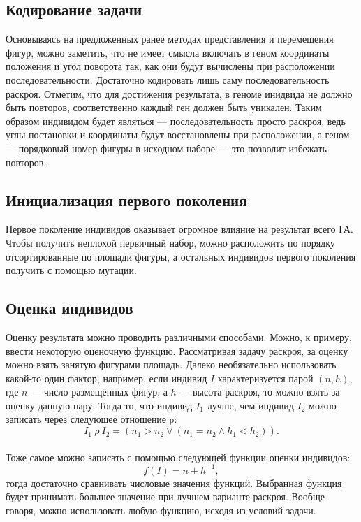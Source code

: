 \documentclass[14pt]{extarticle}
\begin{document}
	\subsection{Кодирование задачи}
	Основываясь на предложенных ранее методах представления и перемещения фигур, можно заметить, что не имеет смысла включать в геном координаты положения и угол поворота так, как они будут вычислены при расположении последовательности. Достаточно кодировать лишь саму последовательность раскроя. Отметим, что для достижения результата, в геноме инидвида не должно быть повторов, соответственно каждый ген должен быть уникален. Таким образом индивидом будет являться --- последовательность просто раскроя, ведь углы постановки и координаты будут восстановлены при расположении, а геном --- порядковый номер фигуры в исходном наборе --- это позволит избежать повторов.
	\subsection{Инициализация первого поколения}
	Первое поколение индивидов оказывает огромное влияние на результат всего ГА. Чтобы получить неплохой первичный набор, можно расположить по порядку отсортированные по площади фигуры, а остальных индивидов первого поколения получить с помощью мутации.
	\subsection{Оценка индивидов}
	Оценку результата можно проводить различными способами. Можно, к примеру, ввести некоторую оценочную функцию. Рассматривая задачу раскроя, за оценку можно взять занятую фигурами площадь. Далеко необязательно использовать какой-то один фактор, например, если индивид $I$ характеризуется парой $(n, h)$, где $n$ --- число размещённых фигур, а $h$ --- высота раскроя, то можно взять за оценку данную пару. Тогда то, что индивид $I_1$ лучше, чем индивид $I_2$ можно записать через следующее отношение $\mathrm{\rho}$:
	\begin{equation}
		I_1~\rho~I_2=(n_1>n_2\lor(n_1=n_2\land h_1<h_2)).
	\end{equation}
	\paragraph{}
	Тоже самое можно записать с помощью следующей функции оценки индивидов:
	\begin{equation}
		f(I)=n+h^{-1},
	\end{equation}
	тогда достаточно сравнивать числовые значения функций. Выбранная функция будет принимать большее значение при лучшем варианте раскроя. Вообще говоря, можно использовать любую функцию, исходя из условий задачи.
\end{document}
